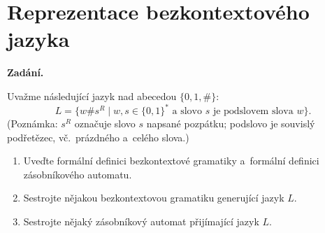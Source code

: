 \section{Reprezentace bezkontextového jazyka}

\noindent\textbf{Zadání.}\par
Uvažme následující jazyk nad abecedou $\{0, 1, \#\}$:
\[ L = \{w \# s^R \mid w, s \in \{0,1\}^* \text{ a~slovo } s \text{ je podslovem slova } w\}. \]
(Poznámka: $s^R$ označuje slovo $s$ napsané pozpátku; podslovo je souvislý podřetězec,
vč.\ prázdného a~celého slova.)
\begin{enumerate}
\item Uveďte formální definici bezkontextové gramatiky a~formální definici zásobníkového
  automatu.
\item Sestrojte nějakou bezkontextovou gramatiku generující jazyk $L$.
\item Sestrojte nějaký zásobníkový automat přijímající jazyk $L$.
\end{enumerate}

